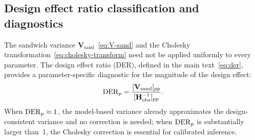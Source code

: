 
\subsection{Design effect ratio classification and diagnostics}
\label{smc:der}

The sandwich variance $\mathbf{V}_{\mathrm{sand}}$~\eqref{eq:V-sand}
and the Cholesky transformation~\eqref{eq:cholesky-transform} need not
be applied uniformly to every parameter.  The design effect ratio
(DER), defined in the main text~\eqref{eq:der}, provides a
parameter-specific diagnostic for the magnitude of the design effect:
\begin{equation}\label{smc:eq-der-recall}
  \operatorname{DER}_{p}
  = \frac{[\mathbf{V}_{\mathrm{sand}}]_{pp}}
         {[\mathbf{H}_{\mathrm{obs}}^{-1}]_{pp}}.
\end{equation}
When $\operatorname{DER}_p \approx 1$, the model-based variance already
approximates the design-consistent variance and no correction is
needed; when $\operatorname{DER}_p$ is substantially larger than~1, the Cholesky
correction is essential for calibrated inference.


